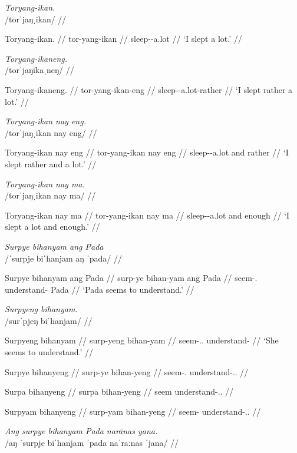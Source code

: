 \documentclass[12pt,a4paper]{scrartcl}
\newcommand{\TsgF}{{\Tsg}.{\F}}
\begin{document}
\ex\begingl
\glpreamble \textit{Toryang-ikan.} \\
	/torˈjaŋˌikan/ //

\gla Toryang-ikan. //
\glb tor-yang-ikan //
\glc sleep-\Fsg{}-a.lot //
\glft `I slept a lot.' //
\endgl\xe

\ex\begingl
\glpreamble \textit{Toryang-ikaneng.} \\
	/torˈjaŋikaˌneŋ/ //

\gla Toryang-ikaneng. //
\glb tor-yang-ikan-eng //
\glc sleep-\Fsg{}-a.lot-rather //
\glft `I slept rather a lot.' //
\endgl\xe

\ex\ljudge*\begingl
\glpreamble \textit{Toryang-ikan nay eng.} \\
	/torˈjaŋˌikan nay eng/ //

\gla Toryang-ikan nay eng //
\glb tor-yang-ikan nay eng //
\glc sleep-\Fsg{}-a.lot and rather //
\glft `I slept rather and a lot.' //
\endgl\xe

\ex\ljudge*\begingl
\glpreamble \textit{Toryang-ikan nay ma.} \\
	/torˈjaŋˌikan nay ma/ //

\gla Toryang-ikan nay ma //
\glb tor-yang-ikan nay ma //
\glc sleep-\Fsg{}-a.lot and enough //
\glft `I slept a lot and enough.' //
\endgl\xe

\ex\begingl
\glpreamble \textit{Surpye bihanyam ang Pada} \\
	/ˈsurpje biˈhanjam aŋ ˈpada/ //

\gla Surpye bihanyam ang Pada //
\glb surp-ye bihan-yam ang Pada //
\glc seem-\TsgF{} understand-\Ptcp{} \Aarg{} Pada //
\glft `Pada seems to understand.' //
\endgl\xe

\pex
\a\begingl
\glpreamble \textit{Surpyeng bihanyam.} \\
	/surˈpjeŋ biˈhanjam/ //

\gla Surpyeng bihanyam //
\glb surp-yeng bihan-yam //
\glc seem-\TsgF{}.\Aarg{} understand-\Ptcp{} //
\glft `She seems to understand.' //
\endgl

\a\ljudge*\begingl
\gla Surpye bihanyeng //
\glb surp-ye bihan-yeng //
\glc seem-\TsgF{} understand-\TsgF{}.\Aarg{} //
\endgl

\a\ljudge*\begingl
\gla Surpa bihanyeng //
\glb surpa bihan-yeng //
\glc seem understand-\TsgF{}.\Aarg{} //
\endgl

\a\ljudge*\begingl
\gla Surpyam bihanyeng //
\glb surp-yam bihan-yeng //
\glc seem-\Ptcp{} understand-\TsgF{}.\Aarg{} //
\endgl
\xe

\pex
\a\begingl
\glpreamble \textit{Ang surpye bihanyam Pada narānas yana.} \\
	/aŋ ˈsurpje biˈhanjam ˈpada naˈraːnas ˈjana/ //
\end{document}
